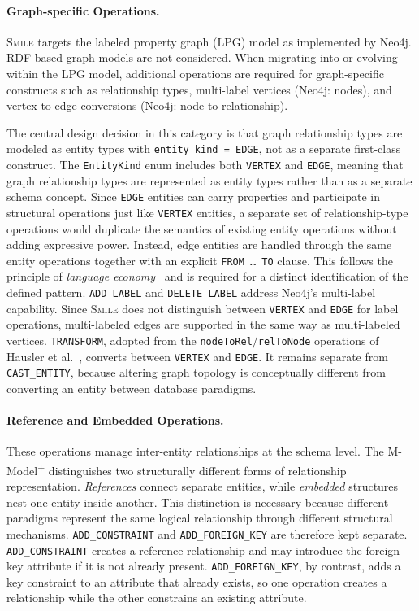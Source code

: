 \documentclass{llncs}
\begin{document}
\paragraph{Graph-specific Operations.}
\textsc{Smile} targets the labeled property graph (LPG) model as implemented by Neo4j. RDF-based graph models are not considered.
When migrating into or evolving within the LPG model, additional operations are required for graph-specific constructs such as relationship types, multi-label vertices (Neo4j: nodes), and vertex-to-edge conversions (Neo4j: node-to-relationship).

The central design decision in this category is that graph relationship types are modeled as entity types with \texttt{entity\_kind = EDGE}, not as a separate first-class construct. The \texttt{EntityKind} enum includes both \texttt{VERTEX} and \texttt{EDGE}, meaning that graph relationship types are represented as entity types rather than as a separate schema concept.
Since \texttt{EDGE} entities can carry properties and participate in structural operations just like \texttt{VERTEX} entities, a separate set of relationship-type operations would duplicate the semantics of existing entity operations without adding expressive power. Instead, edge entities are handled through the same entity operations together with an explicit \texttt{FROM \ldots\ TO} clause.
This follows the principle of \emph{language economy}~\cite{hoare1973hints} and is required for a distinct identification of the defined pattern. \texttt{ADD\_LABEL} and \texttt{DELETE\_LABEL} address Neo4j's multi-label capability. Since \textsc{Smile} does not distinguish between \texttt{VERTEX} and \texttt{EDGE} for label operations, multi-labeled edges are supported in the same way as multi-labeled vertices. \texttt{TRANSFORM}, adopted from the \texttt{nodeToRel}/\texttt{relToNode} operations of Hausler et al.~\cite{hausler2023language}, converts between \texttt{VERTEX} and \texttt{EDGE}. It remains separate from \texttt{CAST\_ENTITY}, because altering graph topology is conceptually different from converting an entity between database paradigms.


\paragraph{Reference and Embedded Operations.}
These operations manage inter-entity relationships at the schema level.
The M-Model\textsuperscript{+} distinguishes two structurally different forms of relationship representation. \emph{References} connect separate entities, while \emph{embedded} structures nest one entity inside another. This distinction is necessary because different paradigms represent the same logical relationship through different structural mechanisms. \texttt{ADD\_CONSTRAINT} and \texttt{ADD\_FOREIGN\_KEY} are therefore kept separate. \texttt{ADD\_CONSTRAINT} creates a reference relationship and may introduce the foreign-key attribute if it is not already present.
\texttt{ADD\_FOREIGN\_KEY}, by contrast, adds a key constraint to an attribute that already exists, so one operation creates a relationship while the other constrains an existing attribute.
\end{document}
